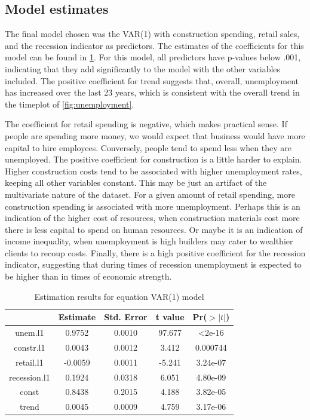 \documentclass[twoside,twocolumn]{article}
\begin{document}
 \subsection{Model estimates} \label{estimates}

The final model chosen was the VAR(1) with construction spending, retail sales, and the recession indicator as predictors.
 The estimates of the coefficients for this model can be found in \ref{tab:estimates}. For this model, all predictors have p-values below .001, indicating that they add significantly to the model with the other variables included. The positive coefficient for trend suggests that, overall, unemployment has increased over the last 23 years, which is consistent with the overall trend in the timeplot of \ref{fig:unemployment}. 
 

The coefficient for retail spending is negative, which makes practical sense. If people are spending more money, we would expect that business would have more capital to hire employees. Conversely, people tend to spend less when they are unemployed.  The positive coefficient for construction is a little harder to explain. Higher construction costs tend to be associated with higher unemployment rates, keeping all other variables constant.  This may be just an artifact of the multivariate nature of the dataset. For a given amount of retail spending, more construction spending is associated with more unemployment. Perhaps this is an indication of the higher cost of resources, when construction materials cost more there is less capital to spend on human resources. Or maybe it is an indication of income inequality, when unemployment is high builders may cater to wealthier clients to recoup costs. Finally, there is a high positive coefficient for the recession indicator, suggesting that during times of recession unemployment is expected to be higher than in times of economic strength.
 

{\small
\begin{table}[htb]
\centering
\caption{Estimation results for equation VAR(1) model}
\label{tab:estimates}
\begin{tabular}{@{}ccccc@{}}
\toprule
& Estimate & Std. Error & t value & Pr(\(>|t|\))     \\ \midrule
unem.l1      & 0.9752  & 0.0010 & 97.677 & \textless  2e-16 \\
constr.l1    & 0.0043 & 0.0012 & 3.412  & 0.000744 \\
retail.l1    & -0.0059 & 0.0011 & -5.241 & 3.24e-07 \\
recession.l1 & 0.1924  & 0.0318 & 6.051  & 4.80e-09 \\
const        & 0.8438  & 0.2015 & 4.188  & 3.82e-05 \\
trend        & 0.0045  & 0.0009 & 4.759  & 3.17e-06 \\ \bottomrule
\end{tabular}
\end{table}}
\end{document}
